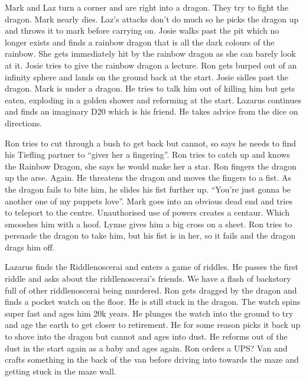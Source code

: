 \begin{multicols}{2}
Mark and Laz turn a corner and are right into a dragon. They try to fight the dragon. Mark nearly dies. Laz’s attacks don’t do much so he picks the dragon up and throws it to mark before carrying on. Josie walks past the pit which no longer exists and finds a rainbow dragon that is all the dark colours of the rainbow. She gets immediately hit by the rainbow dragon as she can barely look at it. Josie tries to give the rainbow dragon a lecture. Ron gets burped out of an infinity sphere and lands on the ground back at the start. Josie sidles past the dragon. Mark is under a dragon. He tries to talk him out of killing him but gets eaten, exploding in a golden shower and reforming at the start. Lazarus continues and finds an imaginary D20 which is his friend. He takes advice from the dice on directions.\medskip

Ron tries to cut through a bush to get back but cannot, so says he needs to find his Tiefling partner to “giver her a fingering”. Ron tries to catch up and knows the Rainbow Dragon, she says he would make her a star. Ron fingers the dragon up the arse. Again. He threatens the dragon and moves the fingers to a fist. As the dragon fails to bite him, he slides his fist further up. “You’re just gonna be another one of my puppets love”. Mark goes into an obvious dead end and tries to teleport to the centre. Unauthorised use of powers creates a centaur. Which smooshes him with a hoof. Lynne gives him a big cross on a sheet. Ron tries to persuade the dragon to take him, but his fist is in her, so it fails and the dragon drags him off.\medskip

Lazarus finds the Riddlenoscerai and enters a game of riddles. He passes the first riddle and asks about the riddlenoscerai’s friends. We have a flash of backstory full of other riddlenoscerai being murdered. Ron gets dragged by the dragon and finds a pocket watch on the floor. He is still stuck in the dragon. The watch spins super fast and ages him 20k years. He plunges the watch into the ground to try and age the earth to get closer to retirement. He for some reason picks it back up to shove into the dragon but cannot and ages into dust. He reforms out of the dust in the start again as a baby and ages again. Ron orders a UPS? Van and crafts something in the back of the van before driving into towards the maze and getting stuck in the maze wall.\medskip


\end{multicols}
